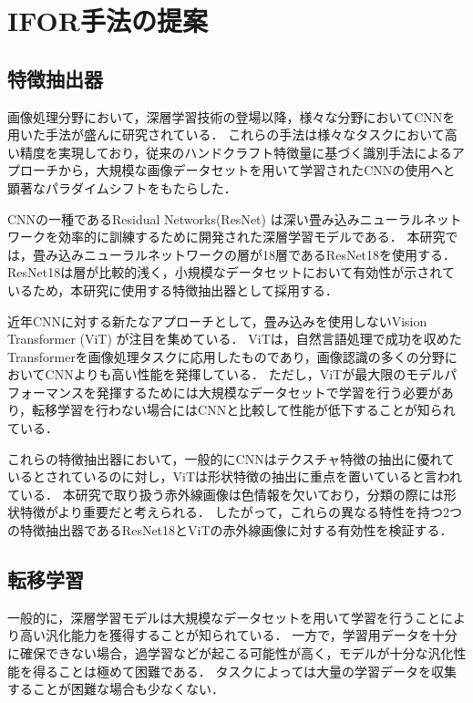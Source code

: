 \documentclass[a4paper,11pt,nomag]{jsreport}
\begin{document}
\section{IFOR手法の提案}

\subsection{特徴抽出器}

画像処理分野において，深層学習技術の登場以降，様々な分野においてCNNを用いた手法が盛んに研究されている．
これらの手法は様々なタスクにおいて高い精度を実現しており，従来のハンドクラフト特徴量に基づく識別手法によるアプローチから，大規模な画像データセットを用いて学習されたCNNの使用へと顕著なパラダイムシフトをもたらした．

CNNの一種であるResidual Networks(ResNet) \cite{resnet}は深い畳み込みニューラルネットワークを効率的に訓練するために開発された深層学習モデルである．
本研究では，畳み込みニューラルネットワークの層が18層であるResNet18を使用する．
ResNet18は層が比較的浅く，小規模なデータセットにおいて有効性が示されているため，本研究に使用する特徴抽出器として採用する．

近年CNNに対する新たなアプローチとして，畳み込みを使用しないVision Transformer (ViT) \cite{vit}が注目を集めている．
ViTは，自然言語処理で成功を収めたTransformerを画像処理タスクに応用したものであり，画像認識の多くの分野においてCNNよりも高い性能を発揮している．
ただし，ViTが最大限のモデルパフォーマンスを発揮するためには大規模なデータセットで学習を行う必要があり，転移学習を行わない場合にはCNNと比較して性能が低下することが知られている\cite{vit}．

これらの特徴抽出器において，一般的にCNNはテクスチャ特徴の抽出に優れているとされているのに対し，ViTは形状特徴の抽出に重点を置いていると言われている\cite{feature}．
本研究で取り扱う赤外線画像は色情報を欠いており，分類の際には形状特徴がより重要だと考えられる．
したがって，これらの異なる特性を持つ2つの特徴抽出器であるResNet18とViTの赤外線画像に対する有効性を検証する．

\subsection{転移学習}

一般的に，深層学習モデルは大規模なデータセットを用いて学習を行うことにより高い汎化能力を獲得することが知られている．
一方で，学習用データを十分に確保できない場合，過学習などが起こる可能性が高く，モデルが十分な汎化性能を得ることは極めて困難である．
タスクによっては大量の学習データを収集することが困難な場合も少なくない．
\end{document}
